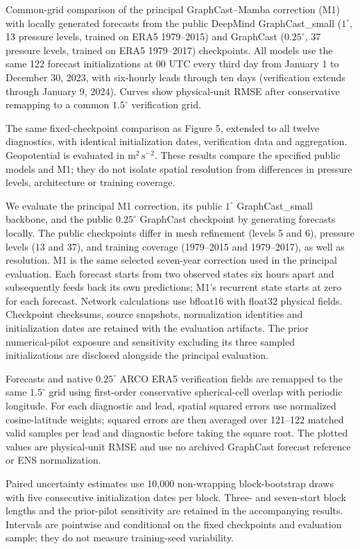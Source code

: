 
Common-grid comparison of the principal GraphCast--Mamba correction (M1)
with locally generated forecasts from the public DeepMind GraphCast_small
($1^\circ$, 13 pressure levels, trained on ERA5 1979--2015) and GraphCast
($0.25^\circ$, 37 pressure levels, trained on ERA5 1979--2017) checkpoints.
All models use the same 122 forecast initializations at 00 UTC every third
day from January 1 to December 30, 2023, with six-hourly leads through ten
days (verification extends through January 9, 2024). Curves show physical-unit
RMSE after conservative remapping to a common
$1.5^\circ$ verification grid.

The same fixed-checkpoint comparison as Figure 5, extended to all twelve
diagnostics, with identical initialization dates, verification data and
aggregation. Geopotential is evaluated in
$\mathrm{m^2\,s^{-2}}$. These results compare the specified public models
and M1; they do not isolate spatial resolution from differences in pressure
levels, architecture or training coverage.

We evaluate the principal M1 correction, its public $1^\circ$ GraphCast_small
backbone, and the public $0.25^\circ$ GraphCast checkpoint by generating
forecasts locally. The public checkpoints differ in mesh refinement
(levels 5 and 6), pressure levels (13 and 37), and training coverage
(1979--2015 and 1979--2017), as well as resolution. M1 is the same selected
seven-year correction used in the principal evaluation. Each forecast starts
from two observed states six hours apart and subsequently feeds back its own
predictions; M1's recurrent state starts at zero for each forecast.
Network calculations use bfloat16 with float32 physical fields. Checkpoint
checksums, source snapshots, normalization identities and initialization dates
are retained with the evaluation artifacts. The prior numerical-pilot exposure
and sensitivity excluding its three sampled initializations are disclosed
alongside the principal evaluation.

Forecasts and native $0.25^\circ$ ARCO ERA5 verification fields are remapped
to the same $1.5^\circ$ grid using first-order conservative spherical-cell
overlap with periodic longitude. For each diagnostic and lead, spatial squared
errors use normalized cosine-latitude weights; squared errors are then averaged
over 121--122 matched valid samples per lead and diagnostic before taking the
square root. The plotted
values are physical-unit RMSE and use no archived GraphCast forecast reference
or ENS normalization.

Paired uncertainty estimates use 10,000 non-wrapping block-bootstrap draws with
five consecutive initialization dates per block. Three- and seven-start block
lengths and the prior-pilot sensitivity are retained in the accompanying
results. Intervals are pointwise and conditional on the fixed checkpoints and
evaluation sample; they do not measure training-seed variability.
